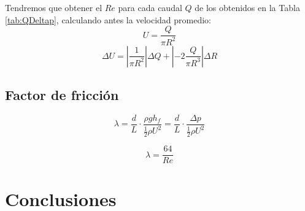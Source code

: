 \documentclass[a4paper,12pt,spanish]{article}
\begin{document}

	
	Tendremos que obtener el $Re$ para cada caudal $Q$ de los obtenidos en la Tabla \ref{tab:QDeltap}, calculando antes la velocidad promedio:
	\[ U = \frac{Q}{\pi R^2}
	\]
	\[ \Delta U = \left| \frac{1}{\pi R^2}
	\right|\Delta Q + \left| -2\frac{Q}{\pi R^3}
	\right| \Delta R
	\]
	
	\subsection*{Factor de fricción}
	
	\[\lambda = \frac{d}{L} \cdot \frac{\rho g h_f}{\frac{1}{2} \rho U^2} = \frac{d}{L} \cdot \frac{\mathit{\Delta}p}{\frac{1}{2} \rho U^2}\]

	\[\lambda = \frac{64}{Re}\]

	
	
	\section{Conclusiones}
	
	
	
	
\end{document}
